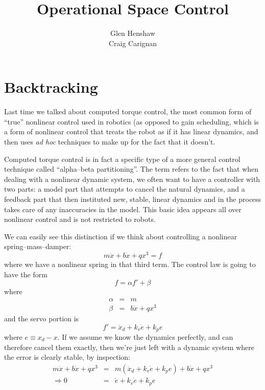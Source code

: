\documentclass[]{article}
\title{Operational Space Control}
\author{Glen Henshaw\\Craig Carignan}
\begin{document}
\maketitle

\section{Backtracking}
Last time we talked about computed torque control, the most common form of ``true'' nonlinear control used in robotics (as opposed to gain scheduling, which is a form of nonlinear control that treats the robot as if it has linear dynamics, and then uses \textit{ad hoc} techniques to make up for the fact that it doesn't.

Computed torque control is in fact a specific type of a more general control technique called ``alpha--beta partitioning''. The term refers to the fact that when dealing with a nonlinear dynamic system, we often want to have a controller with two parts: a model part that attempts to cancel the natural dynamics, and a feedback part that then instituted new, stable, linear dynamics and in the process takes care of any inaccuracies in the model. This basic idea appears all over nonlinear control and is not restricted to robots.

We can easily see this distinction if we think about controlling a nonlinear spring--mass--damper:
\begin{equation}
 m\ddot{x}+b\dot{x}+qx^{3} = f
\end{equation}
where we have a nonlinear spring in that third term. The control law is going to have the form
\begin{displaymath}
 f = \alpha f' + \beta
\end{displaymath}
where
\begin{eqnarray}
 \alpha & = & m \nonumber \\
 \beta & = & b\dot{x} + qx^{3} \nonumber
\end{eqnarray}
and the servo portion is
\begin{displaymath}
 f' = \ddot{x}_{d} + k_{v}\dot{e}+k_{p}e
\end{displaymath}
where $e \equiv x_{d}-x$.
If we assume we know the dynamics perfectly, and can therefore cancel them exactly, then we're just left with a dynamic system where the error is clearly stable, by inspection:
\begin{eqnarray}
  m\ddot{x}+b\dot{x}+qx^{3} & = & m\left(\ddot{x}_{d} + k_{v}\dot{e}+k_{p}e\right) +b\dot{x}+qx^{3} \nonumber \\
  \Rightarrow 0 & = & \ddot{e} + k_{v}\dot{e} + k_{p}e \nonumber
\end{eqnarray}
\end{document}
